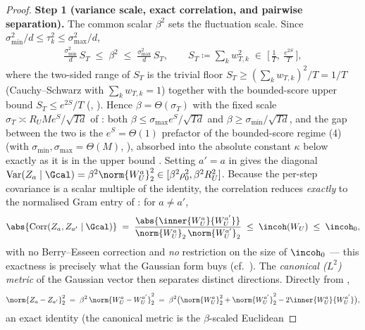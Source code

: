 \begin{proof}
\smallskip\noindent\textbf{Step 1 (variance scale, exact correlation, and
pairwise separation).} The common scalar $\beta^2$ sets the fluctuation
scale. Since $\sigma_{\min}^2/d\le\tau_k^2\le\sigma_{\max}^2/d$,
\begin{align}\label{eq:antic_beta}
   \tfrac{\sigma_{\min}^2}{d}\,S_T \;\le\; \beta^2 \;\le\; \tfrac{\sigma_{\max}^2}{d}\,S_T,
   \qquad
   S_T\coloneqq\sum_k w_{T,k}^2 \;\in\; \bigl[\,\tfrac1T,\ \tfrac{e^{2S}}{T}\,\bigr],
\end{align}
where the two-sided range of $S_T$ is the trivial floor $S_T\ge(\sum_k w_{T,k})^2/T=1/T$
(Cauchy--Schwarz with $\sum_k w_{T,k}=1$) together with the bounded-score
upper bound $S_T\le e^{2S}/T$ (,
). Hence $\beta=\Theta(\sigma_T)$ with the fixed scale
$\sigma_T\asymp R_U M e^S/\sqrt{Td}$ of : both
$\beta\le\sigma_{\max}e^S/\sqrt{Td}$ and
$\beta\ge\sigma_{\min}/\sqrt{Td}$, and the gap between the two is the
$e^S=\Theta(1)$ prefactor of the bounded-score regime
(4) (with $\sigma_{\min},\sigma_{\max}=\Theta(M)$,
), absorbed into the absolute constant
$\kappa$ below exactly as it is in the upper bound .
Setting $a'=a$ in
 gives the diagonal
$\operatorname{Var}(Z_a\mid\Gcal)=\beta^2\norm{W_U^a}_2^2\in[\beta^2\rho_0^2,\beta^2 R_U^2]$.
Because the per-step covariance is a scalar multiple of the identity, the
correlation reduces \emph{exactly} to the normalised Gram entry of
: for $a\neq a'$,
\begin{align}\label{eq:antic_corr}
   \abs{\operatorname{Corr}(Z_a,Z_{a'}\mid\Gcal)}
   \;=\; \frac{\abs{\inner{W_U^a}{W_U^{a'}}}}{\norm{W_U^a}_2\,\norm{W_U^{a'}}_2}
   \;\le\; \incoh(W_U) \;\le\; \incoh_0 ,
\end{align}
with no Berry--Esseen correction and \emph{no} restriction on the size of
$\incoh_0$ --- this exactness is precisely what the Gaussian form
 buys (cf.\ ).
The \emph{canonical (}$L^2$\emph{) metric} of the Gaussian vector then
separates distinct directions. Directly from ,
\begin{align}\label{eq:antic_delta}
   \norm{Z_a-Z_{a'}}_2^2
   \;=\; \beta^2\,\norm{W_U^a-W_U^{a'}}_2^2
   \;=\; \beta^2\bigl(\norm{W_U^a}_2^2+\norm{W_U^{a'}}_2^2-2\inner{W_U^a}{W_U^{a'}}\bigr),
\end{align}
an exact identity (the canonical metric is the $\beta$-scaled Euclidean

\end{proof}
